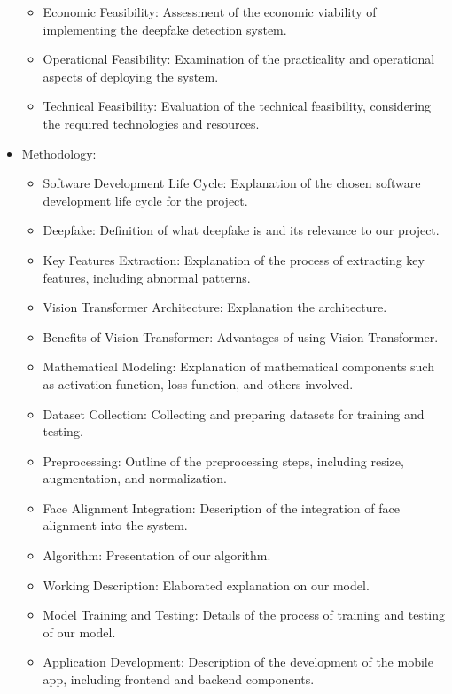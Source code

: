 \begin{itemize}
      \begin{itemize}
        \item Economic Feasibility: Assessment of the economic viability of implementing the deepfake detection system.
        \item Operational Feasibility: Examination of the practicality and operational aspects of deploying the system.
        \item Technical Feasibility: Evaluation of the technical feasibility, considering the required technologies and resources.
      \end{itemize}
    \item Methodology:
      \begin{itemize}
        \item Software Development Life Cycle: Explanation of the chosen software development life cycle for the project.
        \item Deepfake: Definition of what deepfake is and its relevance to our project.
        \item Key Features Extraction: Explanation of the process of extracting key features, including abnormal patterns.
        \item Vision Transformer Architecture: Explanation the architecture.
        \item Benefits of Vision Transformer: Advantages of using Vision Transformer.
        \item Mathematical Modeling: Explanation of mathematical components such as activation function, loss function, and others involved.
        \item Dataset Collection: Collecting and preparing datasets for training and testing.
        \item Preprocessing: Outline of the preprocessing steps, including resize, augmentation, and normalization.
        \item Face Alignment Integration: Description of the integration of face alignment into the system.
        \item Algorithm: Presentation of our algorithm.
        \item Working Description: Elaborated explanation on our model.
        \item Model Training and Testing: Details of the process of training and testing of our model.
        \item Application Development: Description of the development of the mobile app, including frontend and backend components.
      \end{itemize}

\end{itemize}
